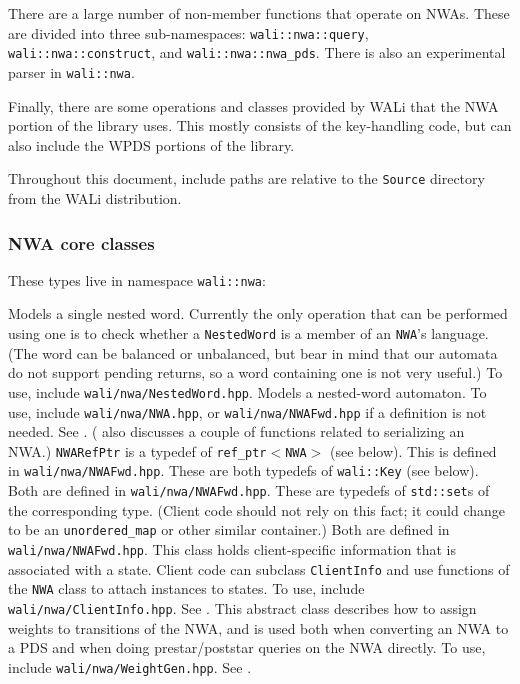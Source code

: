 There are a large number of non-member functions that operate on NWAs. These
are divided into three sub-namespaces:
\texttt{wali::nwa::query}, \texttt{wali::nwa::construct}, and
\texttt{wali::nwa::nwa\_pds}. There is also an experimental parser in
\texttt{wali::nwa}.

Finally, there are some operations and classes provided by WALi that the NWA
portion of the library uses. This mostly consists of the key-handling code,
but can also include the WPDS portions of the library.

Throughout this document, include paths are relative to the \texttt{Source}
directory from the WALi distribution.

\subsubsection{NWA core classes}

These types live in namespace \texttt{wali::nwa}:

\begin{functionlist}
   Models a single nested word. Currently the only
    operation that can be performed using one is to check whether a
    \texttt{NestedWord} is a member of an \texttt{NWA}'s language. (The word can be
    balanced or unbalanced, but bear in mind that our automata do not support
    pending returns, so a word containing one is not very useful.) To use,
    include \texttt{wali/nwa/NestedWord.hpp}.
   Models a nested-word automaton. To use, include
    \texttt{wali/nwa/NWA.hpp}, or \texttt{wali/nwa/NWAFwd.hpp} if a
    definition is not needed. See
    . ( also discusses a couple of
    functions related to serializing an NWA.)
   \texttt{NWARefPtr} is a typedef of \texttt{ref\_ptr$<$NWA$>$} (see
    below). This is defined in \texttt{wali/nwa/NWAFwd.hpp}.
   These are both typedefs of
    \texttt{wali::Key} (see below). Both are defined in
    \texttt{wali/nwa/NWAFwd.hpp}.
   These are typedefs of
    \texttt{std::set}s of the corresponding type. (Client code should not
    rely on this
    fact; it could change to be an \texttt{unordered\_map} or other similar
    container.) Both are defined in \texttt{wali/nwa/NWAFwd.hpp}.
   This class holds client-specific information that
    is associated with a state. Client code can subclass \texttt{ClientInfo} and use
    functions of the \texttt{NWA} class to attach instances to states. To use,
    include \texttt{wali/nwa/ClientInfo.hpp}. See .
   This abstract class describes how to assign weights
    to transitions of the NWA, and is used both when converting an NWA to a
    PDS and when doing prestar/poststar queries on the NWA directly. To use,
    include \texttt{wali/nwa/WeightGen.hpp}. See .
\end{functionlist}


